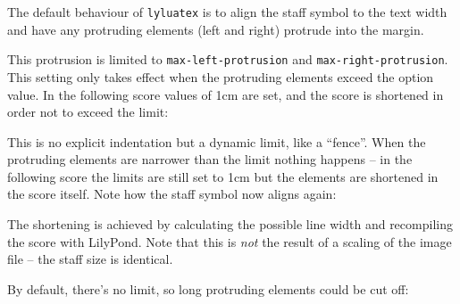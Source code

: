 The default behaviour of \texttt{lyluatex} is to align the staff symbol to the
text width and have any protruding elements (left and right) protrude into the
margin.


This protrusion is limited to \texttt{max-left-protrusion} and
\texttt{max-right-protrusion}.  This setting only takes effect when the
protruding elements exceed the option value.  In the following score values of
1cm are set, and the score is shortened in order not to exceed the limit:


This is no explicit indentation but a dynamic limit, like a “fence”. When the
protruding elements are narrower than the limit nothing happens -- in the
following score the limits are still set to 1cm but the elements are shortened
in the score itself.  Note how the staff symbol now aligns again:


\bigskip
The shortening is achieved by calculating the possible line width and
recompiling the score with LilyPond.  Note that this is \emph{not} the result of
a scaling of the image file -- the staff size is identical.


\bigskip
By default, there's no limit, so long protruding elements could be cut off:


